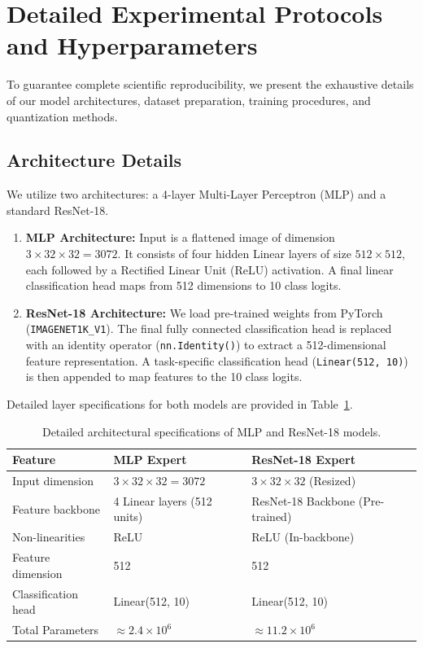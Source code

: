 \documentclass{article}
\theoremstyle{plain}
\theoremstyle{definition}
\theoremstyle{remark}
\begin{document}
\section{Detailed Experimental Protocols and Hyperparameters}
\label{app:protocols}

To guarantee complete scientific reproducibility, we present the exhaustive details of our model architectures, dataset preparation, training procedures, and quantization methods.

\subsection{Architecture Details}
We utilize two architectures: a 4-layer Multi-Layer Perceptron (MLP) and a standard ResNet-18.
\begin{enumerate}
    \item \textbf{MLP Architecture:} Input is a flattened image of dimension $3 \times 32 \times 32 = 3072$. It consists of four hidden Linear layers of size $512 \times 512$, each followed by a Rectified Linear Unit (ReLU) activation. A final linear classification head maps from 512 dimensions to 10 class logits.
    \item \textbf{ResNet-18 Architecture:} We load pre-trained weights from PyTorch (\texttt{IMAGENET1K\_V1}). The final fully connected classification head is replaced with an identity operator (\texttt{nn.Identity()}) to extract a 512-dimensional feature representation. A task-specific classification head (\texttt{Linear(512, 10)}) is then appended to map features to the 10 class logits.
\end{enumerate}

Detailed layer specifications for both models are provided in Table~\ref{tab:layer_spec}.

\begin{table}[h]
\centering
\caption{Detailed architectural specifications of MLP and ResNet-18 models.}
\label{tab:layer_spec}
\begin{tabular}{lll}
\toprule
\textbf{Feature} & \textbf{MLP Expert} & \textbf{ResNet-18 Expert} \\
\midrule
Input dimension & $3 \times 32 \times 32 = 3072$ & $3 \times 32 \times 32$ (Resized) \\
Feature backbone & 4 Linear layers (512 units) & ResNet-18 Backbone (Pre-trained) \\
Non-linearities & ReLU & ReLU (In-backbone) \\
Feature dimension & 512 & 512 \\
Classification head & Linear(512, 10) & Linear(512, 10) \\
Total Parameters & $\approx 2.4 \times 10^6$ & $\approx 11.2 \times 10^6$ \\
\bottomrule
\end{tabular}
\end{table}
\end{document}
